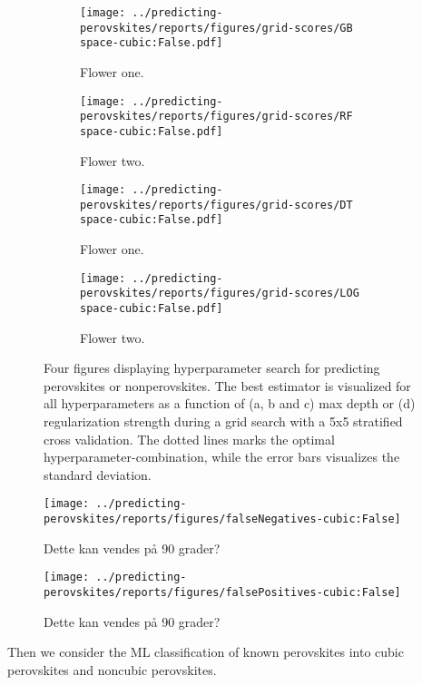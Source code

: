 \begin{figure}[!tbp]
  \begin{subfigure}[b]{0.5\textwidth}
    \texttt{[image: ../predicting-perovskites/reports/figures/grid-scores/GB\\space-cubic:False.pdf]}
    \caption{Flower one.}
    \label{fig:h1-GB}
  \end{subfigure}%
  \hfill
  \begin{subfigure}[b]{0.5\textwidth}
    \texttt{[image: ../predicting-perovskites/reports/figures/grid-scores/RF\\space-cubic:False.pdf]}
    \caption{Flower two.}
    \label{fig:h1-RF}
  \end{subfigure}

  \begin{subfigure}[b]{0.5\textwidth}
    \texttt{[image: ../predicting-perovskites/reports/figures/grid-scores/DT\\space-cubic:False.pdf]}
    \caption{Flower one.}
    \label{fig:h1-DT}
  \end{subfigure}%
  \hfill
  \begin{subfigure}[b]{0.5\textwidth}
    \texttt{[image: ../predicting-perovskites/reports/figures/grid-scores/LOG\\space-cubic:False.pdf]}
    \caption{Flower two.}
    \label{fig:h1-LOG}
  \end{subfigure}
  \caption{{Four figures displaying hyperparameter search for predicting perovskites or nonperovskites. The best estimator is visualized for all hyperparameters as a function of (a, b and c) max depth or (d) regularization strength during a grid search with a 5x5 stratified cross validation. The dotted lines marks the optimal hyperparameter-combination, while the error bars visualizes the standard deviation. }}
\end{figure}



\begin{figure}[!tbp]
  \texttt{[image: ../predicting-perovskites/reports/figures/falseNegatives-cubic:False]}
  \caption{Dette kan vendes på 90 grader?}
  \label{fig:h1-fn}
\end{figure}

\begin{figure}[!tbp]
  \texttt{[image: ../predicting-perovskites/reports/figures/falsePositives-cubic:False]}
  \caption{Dette kan vendes på 90 grader?}
  \label{fig:h1-fp}
\end{figure}


Then we consider the ML classification of known perovskites into cubic perovskites and noncubic perovskites.

